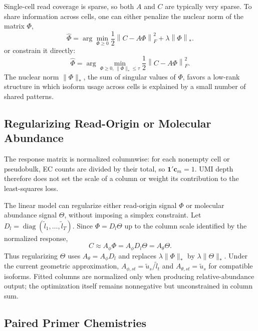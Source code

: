 \documentclass[11pt]{article}
\begin{document}
Single-cell read coverage is sparse, so both \(A\) and \(C\) are typically very
sparse. To share information across cells, one can either penalize the nuclear
norm of the matrix \(\Phi\),
\[
  \hat{\Phi}
  =
  \arg\min_{\Phi \ge 0}
  \frac{1}{2}\left\|C - A\Phi\right\|_F^2
  + \lambda \left\|\Phi\right\|_*.
\]
or constrain it directly:
\[
  \hat{\Phi}
  =
  \arg\min_{\Phi \ge 0,\,\|\Phi\|_* \le \tau}
  \frac{1}{2}\left\|C - A\Phi\right\|_F^2.
\]
The nuclear norm \(\|\Phi\|_*\), the sum of singular values of \(\Phi\), favors
a low-rank structure in which isoform usage across cells is explained by a
small number of shared patterns. 

\subsection*{Regularizing Read-Origin or Molecular Abundance}

The response matrix is normalized columnwise: for each nonempty cell or
pseudobulk, EC counts are divided by their total, so
\(\mathbf{1}'\mathbf{c}_m=1\). UMI depth therefore does not set the scale of a
column or weight its contribution to the least-squares loss.

The linear model can regularize either read-origin signal \(\Phi\) or molecular
abundance signal \(\Theta\), without imposing a simplex constraint. Let
\(D_l=\operatorname{diag}(\tilde l_1,\ldots,\tilde l_T)\). Since
\(\Phi=D_l\Theta\) up to the column scale identified by the normalized
response,
\[
  C \approx A_\phi\Phi
    = A_\phi D_l\Theta
    = A_\theta\Theta.
\]
Thus regularizing \(\Theta\) uses \(A_\theta=A_\phi D_l\) and replaces
\(\lambda\|\Phi\|_*\) by \(\lambda\|\Theta\|_*\). Under the current geometric
approximation, \(A_{\phi,st}=\tilde u_s/\tilde l_t\) and
\(A_{\theta,st}=\tilde u_s\) for compatible isoforms. Fitted columns are
normalized only when producing relative-abundance output; the optimization
itself remains nonnegative but unconstrained in column sum.

\subsection*{Paired Primer Chemistries}
\end{document}
